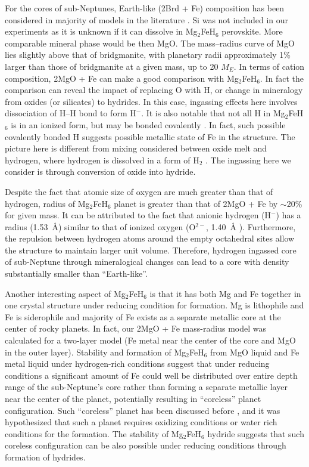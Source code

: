 \documentclass[draft,jgrga,12pt]{agujournal2019}
\begin{document}
For the cores of sub-Neptunes, Earth-like (2Brd + Fe) composition has been considered in majority of models in the literature \cite{valencia_internal_2006, sotin_mass_2007, zeng_detailed_2013}.
Si was not included in our experiments as it is unknown if it can dissolve in Mg$_2$FeH$_6$ perovskite.  
More comparable mineral phase would be then MgO.
The mass–radius curve of MgO lies slightly above that of bridgmanite, with planetary radii approximately 1\% larger than those of bridgmanite at a given mass, up to 20 $M_E$.
In terms of cation composition, 2MgO + Fe can make a good comparison with Mg$_2$FeH$_6$.
In fact the comparison can reveal the impact of replacing O with H, or change in mineralogy from oxides (or silicates) to hydrides.
In this case, ingassing effects here involves dissociation of H--H bond to form H$^{-}$.  
It is also notable that not all H in Mg$_2$FeH$_6$ is in an ionized form, but may be bonded covalently \cite{retuerto_neutron_2015}.
In fact, such possible covalently bonded H suggests possible metallic state of Fe in the structure.
The picture here is different from mixing considered between oxide melt and hydrogen, where hydrogen is dissolved in a form of H$_2$ \cite{gilmore_core_2026}.
The ingassing here we consider is through conversion of oxide into hydride.

Despite the fact that atomic size of oxygen are much greater than that of hydrogen, radius of Mg$_2$FeH$_6$ planet is greater than that of 2MgO + Fe by $\sim$20\% for given mass.  
It can be attributed to the fact that anionic hydrogen (H$^{-}$) has a radius (1.53~{\AA}) similar to that of ionized oxygen (O$^{2-}$, 1.40~{\AA} \cite{shannon_effective_1969}).
Furthermore, the repulsion between hydrogen atoms around the empty octahedral sites allow the structure to maintain larger unit volume.
Therefore, hydrogen ingassed core of sub-Neptune through mineralogical changes can lead to a core with density substantially smaller than ``Earth-like''.

Another interesting aspect of Mg$_2$FeH$_6$ is that it has both Mg and Fe together in one crystal structure under reducing condition for formation.
Mg is lithophile and Fe is siderophile and majority of Fe exists as a separate metallic core at the center of rocky planets.
In fact, our 2MgO + Fe mass-radius model was calculated for a two-layer model (Fe metal near the center of the core and MgO in the outer layer). 
Stability and formation of Mg$_2$FeH$_6$ from MgO liquid and Fe metal liquid under hydrogen-rich conditions suggest that under reducing conditions a significant amount of Fe could well be distributed over entire depth range of the sub-Neptune's core rather than forming a separate metallic layer near the center of the planet, potentially resulting in ``coreless'' planet configuration.
Such ``coreless'' planet has been discussed before \cite{elkins-tanton_coreless_2008}, and it was hypothesized that such a planet requires oxidizing conditions or water rich conditions for the formation.  
The stability of Mg$_2$FeH$_6$ hydride suggests that such coreless configuration can be also possible under reducing conditions through formation of hydrides.
\end{document}
